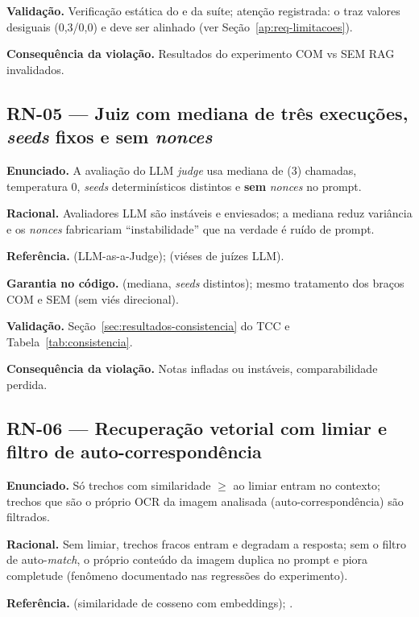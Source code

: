 \textbf{Validação.} Verificação estática do \texttt{} e da suíte; atenção registrada: o \texttt{} traz valores desiguais (0,3/0,0) e deve ser alinhado (ver Seção~\ref{ap:req-limitacoes}).

\textbf{Consequência da violação.} Resultados do experimento COM vs SEM RAG invalidados.

\subsection{RN-05 --- Juiz com mediana de três execuções, \emph{seeds} fixos e sem \emph{nonces}}

\textbf{Enunciado.} A avaliação do LLM \emph{judge} usa mediana de \texttt{} (3) chamadas, temperatura 0, \emph{seeds} determinísticos distintos e \textbf{sem} \emph{nonces} no prompt.

\textbf{Racional.} Avaliadores LLM são instáveis e enviesados; a mediana reduz variância e os \emph{nonces} fabricariam ``instabilidade'' que na verdade é ruído de prompt.

\textbf{Referência.} \cite{zheng_2023} (LLM-as-a-Judge); \cite{wang_2023_not_fair} (viéses de juízes LLM).

\textbf{Garantia no código.}  (mediana, \emph{seeds} distintos); mesmo tratamento dos braços COM e SEM (sem viés direcional).

\textbf{Validação.} Seção~\ref{sec:resultados-consistencia} do TCC e Tabela~\ref{tab:consistencia}.

\textbf{Consequência da violação.} Notas infladas ou instáveis, comparabilidade perdida.

\subsection{RN-06 --- Recuperação vetorial com limiar e filtro de auto-correspondência}

\textbf{Enunciado.} Só trechos com similaridade $\geq$ ao limiar entram no contexto; trechos que são o próprio OCR da imagem analisada (auto-correspondência) são filtrados.

\textbf{Racional.} Sem limiar, trechos fracos entram e degradam a resposta; sem o filtro de auto-\emph{match}, o próprio conteúdo da imagem duplica no prompt e piora completude (fenômeno documentado nas regressões do experimento).

\textbf{Referência.} \cite{reimers_gurevych_2019} (similaridade de cosseno com embeddings); \cite{kluibenschadl_2024_rag}.

